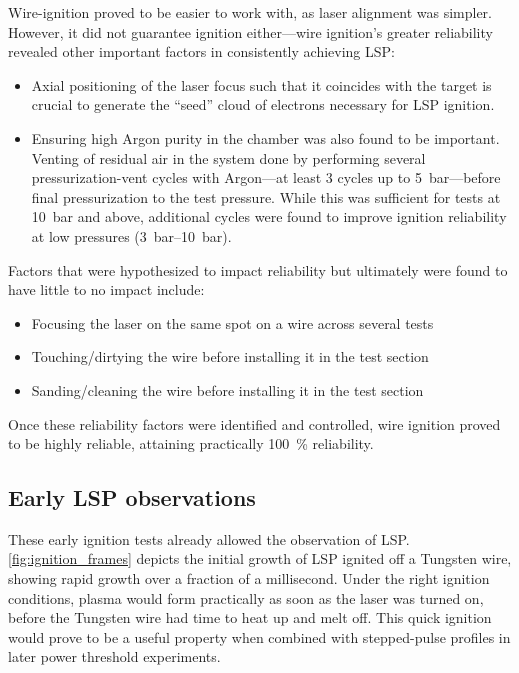             Wire-ignition proved to be easier to work with, as laser alignment was simpler. However, it did not guarantee ignition either---wire ignition's greater reliability revealed other important factors in consistently achieving LSP:
            \begin{itemize}
                \item Axial positioning of the laser focus such that it coincides with the target is crucial to generate the ``seed'' cloud of electrons necessary for LSP ignition.
                \item Ensuring high Argon purity in the chamber was also found to be important. Venting of residual air in the system done by performing several pressurization-vent cycles with Argon---at least 3 cycles up to \qty{5}{bar}---before final pressurization to the test pressure. While this was sufficient for tests at \qty{10}{bar} and above, additional cycles were found to improve ignition reliability at low pressures (\qtyrange{3}{10}{bar}).
            \end{itemize}
            Factors that were hypothesized to impact reliability but ultimately were found to have little to no impact include:
            \begin{itemize}
                \item Focusing the laser on the same spot on a wire across several tests
                \item Touching/dirtying the wire before installing it in the test section
                \item Sanding/cleaning the wire before installing it in the test section
            \end{itemize}
            Once these reliability factors were identified and controlled, wire ignition proved to be highly reliable, attaining practically 100~\% reliability.

        \subsection{Early LSP observations}
            These early ignition tests already allowed the observation of LSP. \autoref{fig:ignition_frames} depicts the initial growth of LSP ignited off a Tungsten wire, showing rapid growth over a fraction of a millisecond. Under the right ignition conditions, plasma would form practically as soon as the laser was turned on, before the Tungsten wire had time to heat up and melt off. This quick ignition would prove to be a useful property when combined with stepped-pulse profiles in later power threshold experiments.

